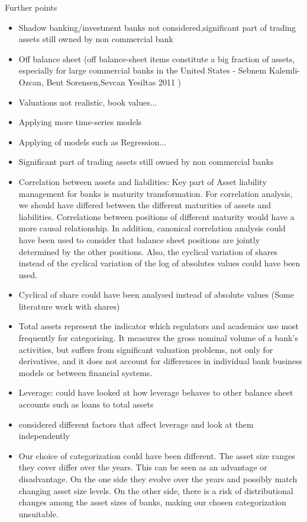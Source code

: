 \documentclass[12pt, a4paper]{article} %
\begin{document}
Further points
\begin{itemize}
\item Shadow banking/investment banks not considered,significant part of trading assets still owned by non commercial bank
\item Off balance sheet (off balance-sheet
items constitute a big fraction of assets, especially for large commercial banks in the United
States - Sebnem Kalemli-Ozcan, Bent Sorensen,Sevcan Yesiltas 2011 )
\item Valuations not realistic, book values...
\item Applying more time-series models
\item Applying of models such as Regression...
\item Significant part of trading assets still owned by non commercial banks
\item Correlation between assets and liabilities: Key part of Asset liability management for banks is maturity transformation. For correlation analysis, we should have differed between the different maturities of assets and liabilities. Correlations between positions of different maturity would have a more causal relationship. In addition, canonical correlation analysis could have been used to consider that balance sheet positions are jointly determined by the other positions. Also, the cyclical variation of shares instead of the cyclical variation of the log of absolutes values could have been used.
\item Cyclical of share could have been analysed instead of absolute values (Some literature work with shares)
\item Total assets represent the indicator which regulators and academics use most
frequently for categorising. It measures the gross nominal volume of a bank’s activities, but
suffers from significant valuation problems, not only for derivatives, and it does
not account for differences in individual bank business models or between
financial systems.
\item Leverage: could have looked at how leverage behaves to other balance sheet accounts such as loans to total assets
\item considered different factors that affect leverage and look at them independently
\item Our choice of categorization could have been different. The asset size ranges they cover differ over the years. This can be seen as an advantage or disadvantage. On the one side they evolve over the years and possibly match changing asset size levels. On the other side, there is a risk of distributional changes among the asset sizes of banks, making our chosen categorization unsuitable.  
\end{itemize}
 
\end{document}
